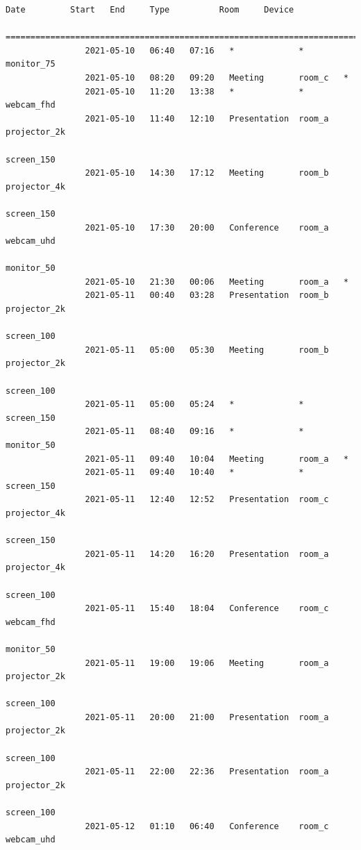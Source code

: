 \documentclass{article}
\begin{document}
\begin{Verbatim}[gobble=8]
                Date         Start   End     Type          Room     Device
                ===========================================================================
                2021-05-10   06:40   07:16   *             *        monitor_75
                2021-05-10   08:20   09:20   Meeting       room_c   *
                2021-05-10   11:20   13:38   *             *        webcam_fhd
                2021-05-10   11:40   12:10   Presentation  room_a   projector_2k
                                                                    screen_150
                2021-05-10   14:30   17:12   Meeting       room_b   projector_4k
                                                                    screen_150
                2021-05-10   17:30   20:00   Conference    room_a   webcam_uhd
                                                                    monitor_50
                2021-05-10   21:30   00:06   Meeting       room_a   *
                2021-05-11   00:40   03:28   Presentation  room_b   projector_2k
                                                                    screen_100
                2021-05-11   05:00   05:30   Meeting       room_b   projector_2k
                                                                    screen_100
                2021-05-11   05:00   05:24   *             *        screen_150
                2021-05-11   08:40   09:16   *             *        monitor_50
                2021-05-11   09:40   10:04   Meeting       room_a   *
                2021-05-11   09:40   10:40   *             *        screen_150
                2021-05-11   12:40   12:52   Presentation  room_c   projector_4k
                                                                    screen_150
                2021-05-11   14:20   16:20   Presentation  room_a   projector_4k
                                                                    screen_100
                2021-05-11   15:40   18:04   Conference    room_c   webcam_fhd
                                                                    monitor_50
                2021-05-11   19:00   19:06   Meeting       room_a   projector_2k
                                                                    screen_100
                2021-05-11   20:00   21:00   Presentation  room_a   projector_2k
                                                                    screen_100
                2021-05-11   22:00   22:36   Presentation  room_a   projector_2k
                                                                    screen_100
                2021-05-12   01:10   06:40   Conference    room_c   webcam_uhd

\end{Verbatim}
\end{document}

